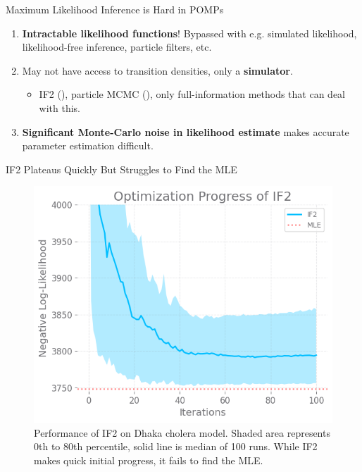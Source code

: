 \documentclass{beamer}
\begin{document}
\begin{frame}{Maximum Likelihood Inference is Hard in POMPs}
    
\begin{enumerate}
    \item \textbf{Intractable likelihood functions}! Bypassed with e.g. simulated likelihood, likelihood-free inference, particle filters, etc. 
    \item \pause May not have access to transition densities, only a \textbf{simulator}. 
    \begin{itemize}
        \item \pause IF2 (\cite{ionides15}), particle MCMC (\cite{doucet2010pmcmc}), only full-information methods that can deal with this.
    \end{itemize}
    \item \pause \textbf{Significant Monte-Carlo noise in likelihood estimate} makes accurate parameter estimation difficult.
\end{enumerate}
\end{frame}

\begin{frame}{IF2 Plateaus Quickly But Struggles to Find the MLE}
\begin{figure}
    \centering
    \includegraphics[scale=0.5]{imgs/095/if2fail.png}
    \caption{Performance of IF2 on \cite{king08} Dhaka cholera model. Shaded area represents 0th to 80th percentile, solid line is median of 100 runs. While IF2 makes quick initial progress, it fails to find the MLE.}
    \label{fig:if2fail}
\end{figure}
\end{frame}
\end{document}
